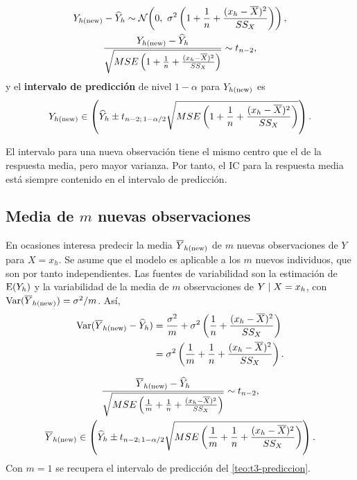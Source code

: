 \begin{teorema}
  \begin{gather*}
    \Ynew-\est{Y}_h \sim \Normal\!\left(0,\ \sigma^2\left(1+\frac1n+\frac{(x_h-\media{X})^2}{\SSX}\right)\right),
    \\
    \frac{\Ynew-\est{Y}_h}{\raizMSE{1+\frac1n+\frac{(x_h-\media{X})^2}{\SSX}}} \sim \tdist{n-2},
  \end{gather*}
  y el \textbf{intervalo de predicción} de nivel $1-\alpha$ para $Y_{h(\mathrm{new})}$ es
  \[
    Y_{h(\mathrm{new})} \in \left(\widehat{Y}_h \pm t_{n-2;\,1-\alpha/2}
    \sqrt{MSE\left(1+\frac1n+\frac{(x_h-\overline{X})^2}{SS_X}\right)}\right).
  \]
\end{teorema}

El intervalo para una nueva observación tiene el mismo centro que el de la respuesta media, pero
mayor varianza. Por tanto, el IC para la respuesta media está siempre contenido en el intervalo de
predicción.

\subsection{Media de \texorpdfstring{$m$}{m} nuevas observaciones}

En ocasiones interesa predecir la media $\overline{Y}_{h(\mathrm{new})}$ de $m$ nuevas observaciones de $Y$ para
$X=x_h$. Se asume que el modelo es aplicable a los $m$ nuevos individuos, que son por tanto
independientes. Las fuentes de variabilidad son la estimación de $\operatorname{E}(Y_h)$ y la variabilidad de
la media de $m$ observaciones de $Y\mid X=x_h$, con $\operatorname{Var}(\overline{Y}_{h(\mathrm{new})})=\sigma^2/m$. Así,
\begin{align*}
  \operatorname{Var}(\overline{Y}_{h(\mathrm{new})}-\widehat{Y}_h) &= \frac{\sigma^2}{m} + \sigma^2\left(\frac1n+\frac{(x_h-\overline{X})^2}{SS_X}\right) \\
  &= \sigma^2\left(\frac1m+\frac1n+\frac{(x_h-\overline{X})^2}{SS_X}\right).
\end{align*}

\begin{resumen}
  \begin{gather*}
    \frac{\overline{Y}_{h(\mathrm{new})}-\widehat{Y}_h}{\sqrt{MSE\left(\frac1m+\frac1n+\frac{(x_h-\overline{X})^2}{SS_X}\right)}}\sim t_{n-2},
    \\
    \overline{Y}_{h(\mathrm{new})} \in \left(\widehat{Y}_h \pm t_{n-2;\,1-\alpha/2}
    \sqrt{MSE\left(\frac1m+\frac1n+\frac{(x_h-\overline{X})^2}{SS_X}\right)}\right).
  \end{gather*}
  Con $m=1$ se recupera el intervalo de predicción del \cref{teo:t3-prediccion}.
\end{resumen}

